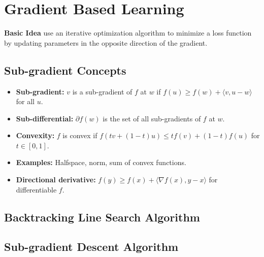 \section{Gradient Based Learning}

\textbf{Basic Idea} use an iterative optimization algorithm to minimize a loss function by updating parameters in the opposite direction of the gradient.

\subsection{Sub-gradient Concepts}
\begin{itemize}
    \item \textbf{Sub-gradient:} $v$ is a sub-gradient of $f$ at $w$ if $f(u) \geq f(w) + \langle v, u-w \rangle$ for all $u$.
    \item \textbf{Sub-differential:} $\partial f(w)$ is the set of all sub-gradients of $f$ at $w$.
    \item \textbf{Convexity:} $f$ is convex if $f(tv + (1-t)u) \leq t f(v) + (1-t)f(u)$ for $t \in [0,1]$.
    \item \textbf{Examples:} Halfspace, norm, sum of convex functions.
    \item \textbf{Directional derivative:} $f(y) \geq f(x) + \langle \nabla f(x), y-x \rangle$ for differentiable $f$.
\end{itemize}

\subsection{Backtracking Line Search Algorithm}
\noindent
{}

\subsection{Sub-gradient Descent Algorithm}
\noindent
{}

